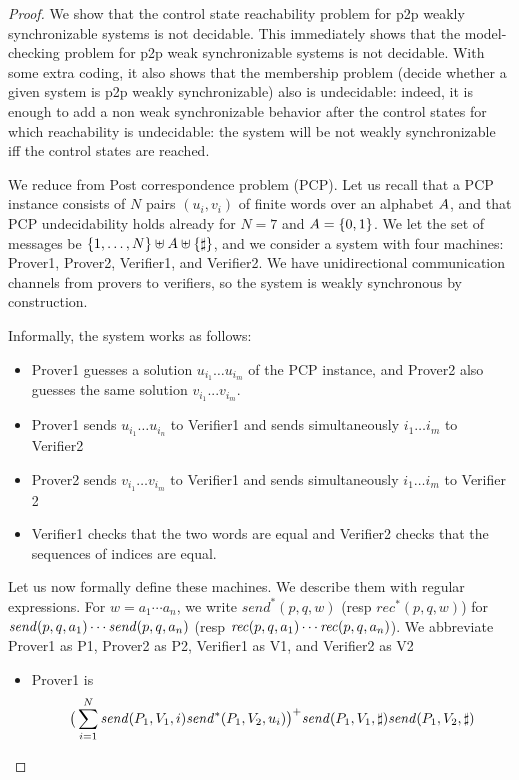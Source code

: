 \documentclass[a4paper,UKenglish,cleveref, autoref, thm-restate]{lipics-v2021}
\begin{document}
\begin{proof}
We show that the control state reachability problem for p2p weakly
synchronizable systems is not decidable. This immediately shows
that the model-checking problem for p2p weak synchronizable systems
is not decidable. With some extra coding, it also shows that the
membership problem (decide whether a given system is p2p weakly synchronizable)
also is undecidable: indeed, it is enough to add a non weak
synchronizable behavior after the control states for which reachability is
undecidable: the system will be not weakly synchronizable iff the control
states are reached.

We reduce from Post correspondence problem (PCP).
Let us recall that a PCP instance consists of $N$ pairs $(u_i,v_i)$ of
finite words over an alphabet $A$, and that PCP undecidability holds already for
$N=7$ and $A=\{0,1\}$. We let the set of messages be
$\{1,\dots,N\}\uplus A\uplus\{\sharp\}$, and we consider a system with
four machines: Prover1, Prover2, Verifier1, and Verifier2. We have
unidirectional communication channels from provers to verifiers,
so the system is weakly synchronous by construction.

Informally, the system works as follows:
\begin{itemize}
\item Prover1 guesses a solution $u_{i_1}\dots u_{i_m}$ of the PCP instance,
and Prover2 also guesses the same solution $v_{i_1}...v_{i_m}$.
\item Prover1 sends $u_{i_1}\dots u_{i_n}$ to Verifier1 and sends
simultaneously $i_1\dots i_m$ to Verifier2
\item Prover2 sends $v_{i_1}\dots v_{i_m}$ to Verifier1 and sends
simultaneously $i_1\dots i_m$ to Verifier 2
\item Verifier1 checks that the two words are equal and Verifier2 checks that the sequences of indices are equal.
\end{itemize}

Let us now formally define these machines.
We describe them with regular expressions. For $w=a_1\cdots a_n$,
we write $\mathit{send}^*(p,q,w)$ (resp $\mathit{rec}^*(p,q,w)$)
for $\mathit{send}(p, q, a_1)\cdots \mathit{send}(p, q, a_n)$ (resp $\mathit{rec}(p, q, a_1)\cdots\mathit{rec}(p, q, a_n)$). We abbreviate Prover1 as P1, Prover2 as P2, Verifier1 as V1, and Verifier2 as V2

\begin{itemize}
\item Prover1 is $$\big(\sum_{i=1}^N\mathit{send}(P_1, V_1, i)\mathit{send}^*(P_1,V_2,u_i)\big)^+\mathit{send}(P_1, V_1, \sharp)\mathit{send}(P_1, V_2, \sharp)$$


\end{itemize}
\end{proof}
\end{document}
